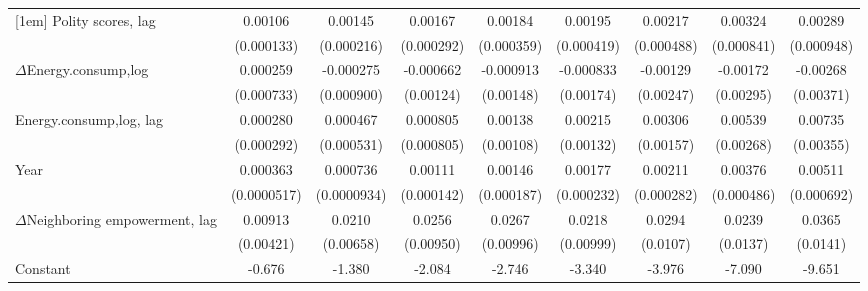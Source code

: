 \begin{table}[htbp]
\begin{tabular}{l*{8}{c}}
[1em]
Polity scores, lag            &     0.00106\sym{***}&     0.00145\sym{***}&     0.00167\sym{***}&     0.00184\sym{***}&     0.00195\sym{***}&     0.00217\sym{***}&     0.00324\sym{***}&     0.00289\sym{***}\\
                    &  (0.000133)         &  (0.000216)         &  (0.000292)         &  (0.000359)         &  (0.000419)         &  (0.000488)         &  (0.000841)         &  (0.000948)         \\
[1em]
$\Delta$Energy.consump,log            &    0.000259         &   -0.000275         &   -0.000662         &   -0.000913         &   -0.000833         &    -0.00129         &    -0.00172         &    -0.00268         \\
                    &  (0.000733)         &  (0.000900)         &   (0.00124)         &   (0.00148)         &   (0.00174)         &   (0.00247)         &   (0.00295)         &   (0.00371)         \\
[1em]
Energy.consump,log, lag              &    0.000280         &    0.000467         &    0.000805         &     0.00138         &     0.00215         &     0.00306\sym{*}  &     0.00539\sym{**} &     0.00735\sym{**} \\
                    &  (0.000292)         &  (0.000531)         &  (0.000805)         &   (0.00108)         &   (0.00132)         &   (0.00157)         &   (0.00268)         &   (0.00355)         \\
[1em]
Year                &    0.000363\sym{***}&    0.000736\sym{***}&     0.00111\sym{***}&     0.00146\sym{***}&     0.00177\sym{***}&     0.00211\sym{***}&     0.00376\sym{***}&     0.00511\sym{***}\\
                    & (0.0000517)         & (0.0000934)         &  (0.000142)         &  (0.000187)         &  (0.000232)         &  (0.000282)         &  (0.000486)         &  (0.000692)         \\
[1em]
$\Delta$Neighboring empowerment, lag&     0.00913\sym{**} &      0.0210\sym{***}&      0.0256\sym{***}&      0.0267\sym{***}&      0.0218\sym{**} &      0.0294\sym{***}&      0.0239\sym{*}  &      0.0365\sym{**} \\
                    &   (0.00421)         &   (0.00658)         &   (0.00950)         &   (0.00996)         &   (0.00999)         &    (0.0107)         &    (0.0137)         &    (0.0141)         \\
[1em]
Constant            &      -0.676\sym{***}&      -1.380\sym{***}&      -2.084\sym{***}&      -2.746\sym{***}&      -3.340\sym{***}&      -3.976\sym{***}&      -7.090\sym{***}&      -9.651\sym{***}\\

\end{tabular}
\end{table}

